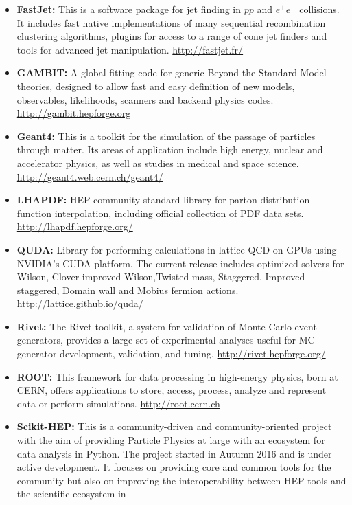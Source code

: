 \begin{itemize}
\item
  \textbf{FastJet:} This is a software package for jet finding in \(pp\)
  and \(e^+e^-\) collisions. It includes fast native implementations of
  many sequential recombination clustering algorithms, plugins for
  access to a range of cone jet finders and tools for advanced jet
  manipulation. \url{http://fastjet.fr/}
\item
  \textbf{GAMBIT:} A global fitting code for generic Beyond the Standard
  Model theories, designed to allow fast and easy definition of new
  models, observables, likelihoods, scanners and backend physics codes.
  \url{http://gambit.hepforge.org}
\item
  \textbf{Geant4:} This is a toolkit for the simulation of the passage
  of particles through matter. Its areas of application include high
  energy, nuclear and accelerator physics, as well as studies in medical
  and space science. \url{http://geant4.web.cern.ch/geant4/}
\item
  \textbf{LHAPDF:} HEP community standard library for parton
  distribution function interpolation, including official collection of
  PDF data sets. \url{http://lhapdf.hepforge.org/}
\item
  \textbf{QUDA:} Library for performing calculations in lattice QCD on
  GPUs using NVIDIA's CUDA platform. The current release includes
  optimized solvers for Wilson, Clover-improved Wilson,Twisted mass,
  Staggered, Improved staggered, Domain wall and Mobius fermion actions.
  \url{http://lattice.github.io/quda/}
\item
  \textbf{Rivet:} The Rivet toolkit, a system for validation of Monte
  Carlo event generators, provides a large set of experimental analyses
  useful for MC generator development, validation, and tuning.
  \url{http://rivet.hepforge.org/}
\item
  \textbf{ROOT:} This framework for data processing in high-energy
  physics, born at CERN, offers applications to store, access, process,
  analyze and represent data or perform simulations.
  \url{http://root.cern.ch}
\item
  \textbf{Scikit-HEP:} This is a community-driven and community-oriented
  project with the aim of providing Particle Physics at large with an
  ecosystem for data analysis in Python. The project started in Autumn
  2016 and is under active development. It focuses on providing core and
  common tools for the community but also on improving the
  interoperability between HEP tools and the scientific ecosystem in

\end{itemize}
